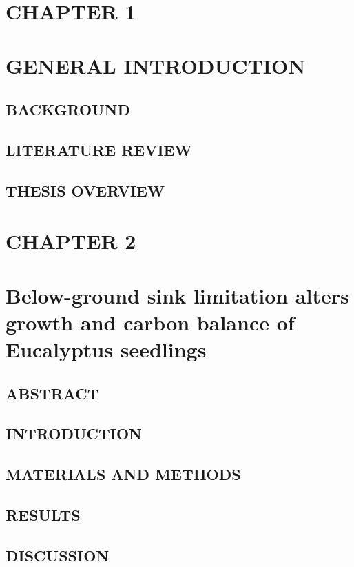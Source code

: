 \documentclass[a4paper]{article}
\begin{document}
\clearpage
\section*{CHAPTER 1 \\ \mbox{ }\\ GENERAL INTRODUCTION}
\subsection*{BACKGROUND}
\subsection*{LITERATURE REVIEW}
\subsection*{THESIS OVERVIEW}

\setcounter{page}{1}     
\clearpage

\section*{CHAPTER 2 \\ \mbox{ }\\ Below-ground sink limitation alters growth and carbon balance of Eucalyptus seedlings}
\subsection*{ABSTRACT}
\subsection*{INTRODUCTION}
\subsection*{MATERIALS AND METHODS}
\subsection*{RESULTS}
\subsection*{DISCUSSION}
\end{document}
